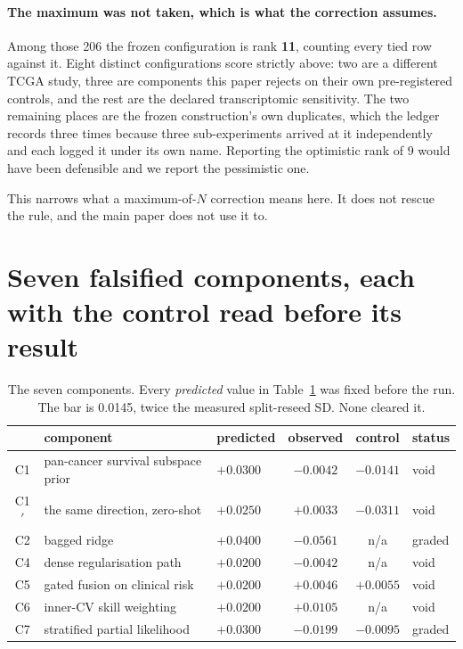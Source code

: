 \documentclass[11pt]{article}
\begin{document}
\paragraph{The maximum was not taken, which is what the correction assumes.} Among those 206 the
frozen configuration is rank \textbf{11}, counting every tied row against it. Eight distinct
configurations score strictly above: two are a different TCGA study, three are components this
paper rejects on their own pre-registered controls, and the rest are the declared transcriptomic
sensitivity. The two remaining places are the frozen construction's own duplicates, which the
ledger records three times because three sub-experiments arrived at it independently and each
logged it under its own name. Reporting the optimistic rank of 9 would have been defensible and we
report the pessimistic one.

This narrows what a maximum-of-$N$ correction means here. It does not rescue the rule, and the
main paper does not use it to.

\section{Seven falsified components, each with the control read before its result}
\begin{table}[h]
\centering
{\small
\begin{tabular}{cllccl}
\toprule
 & component & predicted & observed & control & status \\
\midrule
C1 & pan-cancer survival subspace prior & $+0.0300$ & $-0.0042$ & $-0.0141$ & void \\
C1$'$ & the same direction, zero-shot & $+0.0250$ & $+0.0033$ & $-0.0311$ & void \\
C2 & bagged ridge & $+0.0400$ & $-0.0561$ & n/a & graded \\
C4 & dense regularisation path & $+0.0200$ & $-0.0042$ & n/a & void \\
C5 & gated fusion on clinical risk & $+0.0200$ & $+0.0046$ & $+0.0055$ & void \\
C6 & inner-CV skill weighting & $+0.0200$ & $+0.0105$ & n/a & void \\
C7 & stratified partial likelihood & $+0.0300$ & $-0.0199$ & $-0.0095$ & graded \\
\bottomrule
\end{tabular}}
\caption{The seven components. Every \emph{predicted} value in Table~\ref{tab:sup-components} was fixed before the run. The bar is
0.0145, twice the measured split-reseed SD. None cleared it.}
\label{tab:sup-components}
\end{table}
\end{document}
